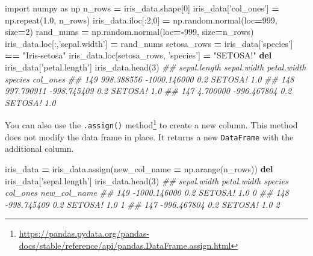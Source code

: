 \documentclass[12pt,krantz2]{krantz}
\makeatletter
\newenvironment{Shaded}{\begin{snugshade}}{\end{snugshade}}
\newcommand{\CommentTok}[1]{\textcolor[rgb]{0.37,0.37,0.37}{\textit{#1}}}
\newcommand{\DecValTok}[1]{\textcolor[rgb]{0.06,0.06,0.06}{#1}}
\newcommand{\FloatTok}[1]{\textcolor[rgb]{0.06,0.06,0.06}{#1}}
\newcommand{\ImportTok}[1]{#1}
\newcommand{\KeywordTok}[1]{\textcolor[rgb]{0.27,0.27,0.27}{\textbf{#1}}}
\newcommand{\NormalTok}[1]{#1}
\newcommand{\OperatorTok}[1]{\textcolor[rgb]{0.43,0.43,0.43}{\textbf{#1}}}
\newcommand{\StringTok}[1]{\textcolor[rgb]{0.5,0.5,0.5}{#1}}
\renewcommand{\href}[2]{#2\footnote{\url{#1}}}
\newenvironment{kframe}{%
\medskip{}
\setlength{\fboxsep}{.8em}
 \def\at@end@of@kframe{}%
 \ifinner\ifhmode%
  \def\at@end@of@kframe{\end{minipage}}%
  \begin{minipage}{\columnwidth}%
 \fi\fi%
 \def\FrameCommand##1{\hskip\@totalleftmargin \hskip-\fboxsep
 \colorbox{shadecolor}{##1}\hskip-\fboxsep
     \hskip-\linewidth \hskip-\@totalleftmargin \hskip\columnwidth}%
 \MakeFramed {\advance\hsize-\width
   \@totalleftmargin\z@ \linewidth\hsize
   \@setminipage}}%
 {\par\unskip\endMakeFramed%
 \at@end@of@kframe}
\renewenvironment{Shaded}{\begin{kframe}}{\end{kframe}}
\makeatother
\begin{document}
\begin{Shaded}
\begin{Highlighting}[]
\ImportTok{import}\NormalTok{ numpy }\ImportTok{as}\NormalTok{ np}
\NormalTok{n_rows }\OperatorTok{=}\NormalTok{ iris_data.shape[}\DecValTok{0}\NormalTok{]}
\NormalTok{iris_data[}\StringTok{'col_ones'}\NormalTok{] }\OperatorTok{=}\NormalTok{ np.repeat(}\FloatTok{1.0}\NormalTok{, n_rows)}
\NormalTok{iris_data.iloc[:}\DecValTok{2}\NormalTok{,}\DecValTok{0}\NormalTok{] }\OperatorTok{=}\NormalTok{  np.random.normal(loc}\OperatorTok{=}\DecValTok{999}\NormalTok{, size}\OperatorTok{=}\DecValTok{2}\NormalTok{)}
\NormalTok{rand_nums }\OperatorTok{=}\NormalTok{ np.random.normal(loc}\OperatorTok{=-}\DecValTok{999}\NormalTok{, size}\OperatorTok{=}\NormalTok{n_rows)}
\NormalTok{iris_data.loc[:,}\StringTok{'sepal.width'}\NormalTok{] }\OperatorTok{=}\NormalTok{ rand_nums}
\NormalTok{setosa_rows }\OperatorTok{=}\NormalTok{ iris_data[}\StringTok{'species'}\NormalTok{] }\OperatorTok{==} \StringTok{"Iris-setosa"}
\NormalTok{iris_data.loc[setosa_rows, }\StringTok{'species'}\NormalTok{] }\OperatorTok{=} \StringTok{"SETOSA!"}
\KeywordTok{del}\NormalTok{ iris_data[}\StringTok{'petal.length'}\NormalTok{]}
\NormalTok{iris_data.head(}\DecValTok{3}\NormalTok{)}
\CommentTok{##      sepal.length  sepal.width  petal.width  species  col_ones}
\CommentTok{## 149    998.388556 -1000.146000          0.2  SETOSA!       1.0}
\CommentTok{## 148    997.790911  -998.745409          0.2  SETOSA!       1.0}
\CommentTok{## 147      4.700000  -996.467804          0.2  SETOSA!       1.0}
\end{Highlighting}
\end{Shaded}

You can also use the \href{https://pandas.pydata.org/pandas-docs/stable/reference/api/pandas.DataFrame.assign.html}{\texttt{.assign()} method} to create a new column. This method does not modify the data frame in place. It returns a new \texttt{DataFrame} with the additional column.

\begin{Shaded}
\begin{Highlighting}[]
\NormalTok{iris_data }\OperatorTok{=}\NormalTok{ iris_data.assign(new_col_name }\OperatorTok{=}\NormalTok{ np.arange(n_rows))}
\KeywordTok{del}\NormalTok{ iris_data[}\StringTok{'sepal.length'}\NormalTok{]}
\NormalTok{iris_data.head(}\DecValTok{3}\NormalTok{)}
\CommentTok{##      sepal.width  petal.width  species  col_ones  new_col_name}
\CommentTok{## 149 -1000.146000          0.2  SETOSA!       1.0             0}
\CommentTok{## 148  -998.745409          0.2  SETOSA!       1.0             1}
\CommentTok{## 147  -996.467804          0.2  SETOSA!       1.0             2}
\end{Highlighting}
\end{Shaded}
\end{document}
